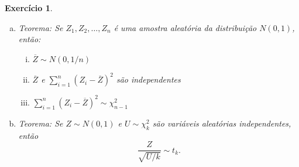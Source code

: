 \documentclass[letter,11pt]{article}
\newtheorem{exer}{Exercício}
\begin{document}
\begin{exer}
\begin{enumerate}[a)]
  \item Teorema: Se $Z_1, Z_2, \ldots, Z_n$ é uma amostra aleatória da 
  distribuição $N(0,1)$, então:
  \begin{enumerate}[i)]
    \item $\overline{Z} \sim N(0, 1/n)$
    \item $\overline{Z}$ e $\sum_{i=1}^n (Z_i-\overline{Z})^2$ são independentes
    \item $\sum_{i=1}^n (Z_i-\overline{Z})^2 \sim \chi^2_{n-1}$
  \end{enumerate}

  \item Teorema: Se $Z \sim N(0,1)$ e $U\sim \chi^2_k$ são variáveis aleatórias 
  independentes, então
  $$
  \frac{Z}{\sqrt{U/k}}\sim t_k.
  $$

\end{enumerate}
\end{exer}
\end{document}
